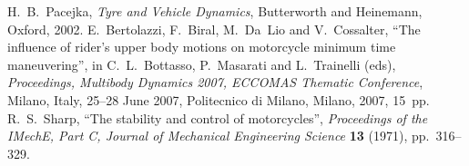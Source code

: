 \documentclass{icsc}
\begin{document}
\begin{thebibliography}{6}
   H.~B.~Pacejka, \textit{Tyre and Vehicle Dynamics},
    Butterworth and Heinemann, Oxford, 2002.
   E.~Bertolazzi, F.~Biral, M.~Da~Lio and V.~Cossalter, ``The
    influence of rider's upper body motions on motorcycle minimum time
    maneuvering'', in C.~L.~Bottasso, P.~Masarati and L.~Trainelli (eds),
    \textit{Proceedings, Multibody Dynamics 2007, ECCOMAS Thematic Conference},
    Milano, Italy, 25--28 June 2007, Politecnico di Milano, Milano, 2007,
    15~pp.
   R.~S.~Sharp, ``The stability and control of motorcycles'',
    \textit{Proceedings of the IMechE, Part C, Journal of Mechanical
    Engineering Science} \textbf{13} (1971), pp.~316--329.
\end{thebibliography}
\thispagestyle{empty}
\end{document}
